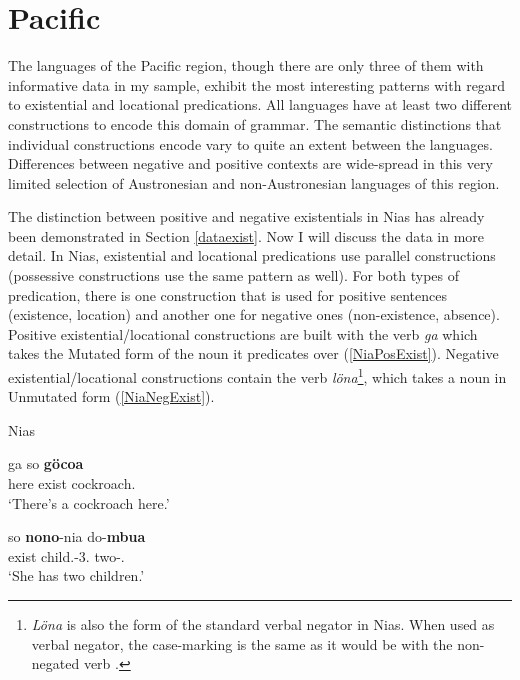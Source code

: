 \section{Pacific}\label{ExistOc}

The languages of the Pacific region, though there are only three of them with informative data in my sample, exhibit the most interesting patterns with regard to existential and locational predications.
All languages have at least two different constructions to encode this domain of grammar. 
The semantic distinctions that individual constructions encode vary to quite an extent between the languages. 
Differences between negative and positive contexts are wide-spread in this very limited selection of Austronesian and non-Austronesian languages of this region. 

The distinction between positive and negative existentials in Nias has already been demonstrated in Section \ref{dataexist}.
Now I will discuss the data in more detail.
In Nias, existential and locational predications use parallel constructions (possessive constructions use the same pattern as well).
For both types of predication, there is one construction that is used for positive sentences (existence, location) and another one for negative ones (non-existence, absence).
Positive existential/locational constructions are built with the verb \emph{ga} which takes the Mutated form of the noun it predicates over (\ref{NiaPosExist}).  
Negative existential/locational constructions contain the verb \emph{l\"ona}\footnote{\textit{Löna} is also the form of the standard verbal negator in Nias.  
When used as verbal negator, the case-marking is the same as it would be with the non-negated verb \citep[471--475]{Brown:2001}.}, which takes a noun in Unmutated form (\ref{NiaNegExist}).

\enlargethispage{\baselineskip}
\begin{exe} \ex\label{NiaPosExist} {Nias} \citep[Sundic; Sumatra, Indonesia; ][344, 570]{Brown:2001}\nopagebreak[4]
\begin{xlist} \ex \gll ga so \textbf{g\"ocoa}\\
here exist cockroach.\mut{}\\
\glt `There's a cockroach here.'

\ex \gll so \textbf{nono}-nia do-\textbf{mbua}\\
exist child.\mut{}-3\sg{}.\poss{} two-\clf{}.\mut{}\\
\glt `She has two children.'
\end{xlist}
\end{exe}

